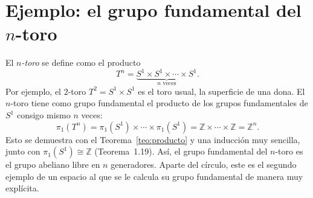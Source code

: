 \documentclass[11pt]{article}
\begin{document}
\section*{Ejemplo: el grupo fundamental del $n$-toro}

El \emph{$n$-toro} se define como el producto
\[
  T^n=\underbrace{S^1\times S^1\times\cdots\times S^1}_{n\text{ veces}}.
\]
Por ejemplo, el $2$-toro $T^2=S^1\times S^1$ es el toro usual, la superficie de una dona. El $n$-toro tiene como grupo fundamental el producto de los grupos fundamentales de $S^1$ consigo mismo $n$ veces:
\[
  \pi_1(T^n)=\pi_1(S^1)\times\cdots\times\pi_1(S^1)=\mathbb{Z}\times\cdots\times\mathbb{Z}=\mathbb{Z}^n.
\]
Esto se demuestra con el Teorema~\ref{teo:producto} y una inducción muy sencilla, junto con $\pi_1(S^1)\cong\mathbb{Z}$ (Teorema~1.19). Así, el grupo fundamental del $n$-toro es el grupo abeliano libre en $n$ generadores. Aparte del círculo, este es el segundo ejemplo de un espacio al que se le calcula su grupo fundamental de manera muy explícita.
\end{document}
